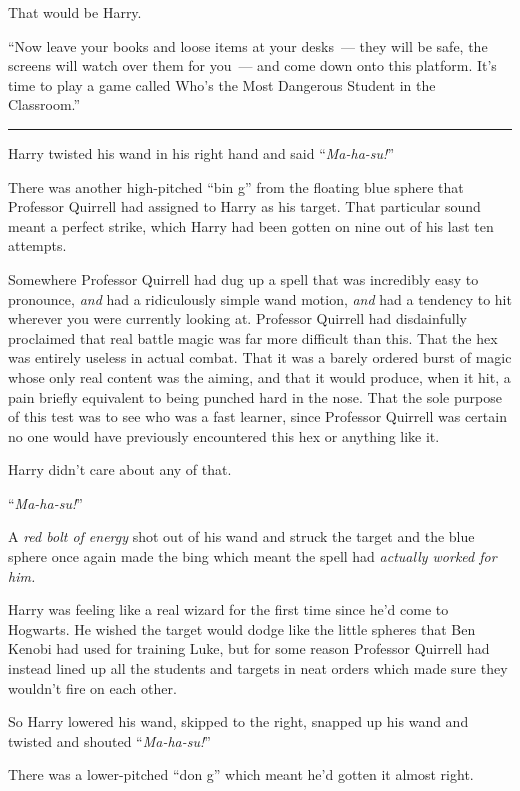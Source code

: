 That would be Harry.

``Now leave your books and loose items at your desks~--- they will be safe, the screens will watch over them for you~--- and come down onto this platform. It's time to play a game called Who's the Most Dangerous Student in the Classroom.''

\begin{center}\rule{3in}{0.4pt}\end{center}

Harry twisted his wand in his right hand and said ``\emph{Ma-ha-su!}''

There was another high-pitched ``bin g'' from the floating blue sphere that Professor Quirrell had assigned to Harry as his target. That particular sound meant a perfect strike, which Harry had been gotten on nine out of his last ten attempts.

Somewhere Professor Quirrell had dug up a spell that was incredibly easy to pronounce, \emph{and} had a ridiculously simple wand motion, \emph{and} had a tendency to hit wherever you were currently looking at. Professor Quirrell had disdainfully proclaimed that real battle magic was far more difficult than this. That the hex was entirely useless in actual combat. That it was a barely ordered burst of magic whose only real content was the aiming, and that it would produce, when it hit, a pain briefly equivalent to being punched hard in the nose. That the sole purpose of this test was to see who was a fast learner, since Professor Quirrell was certain no one would have previously encountered this hex or anything like it.

Harry didn't care about any of that.

``\emph{Ma-ha-su!}''

A \emph{red bolt of energy} shot out of his wand and struck the target and the blue sphere once again made the bing which meant the spell had \emph{actually worked for him.}

Harry was feeling like a real wizard for the first time since he'd come to Hogwarts. He wished the target would dodge like the little spheres that Ben Kenobi had used for training Luke, but for some reason Professor Quirrell had instead lined up all the students and targets in neat orders which made sure they wouldn't fire on each other.

So Harry lowered his wand, skipped to the right, snapped up his wand and twisted and shouted ``\emph{Ma-ha-su!}''

There was a lower-pitched ``don g'' which meant he'd gotten it almost right.


